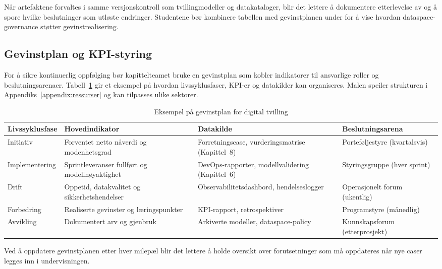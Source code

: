 Når artefaktene forvaltes i samme versjonskontroll som tvillingmodeller og datakataloger, blir det lettere å dokumentere etterlevelse av \citet{gaiax2023architecture} og å spore hvilke beslutninger som utløste endringer. Studentene bør kombinere tabellen med gevinstplanen under for å vise hvordan dataspace-governance støtter gevinstrealisering.

\subsection*{Gevinstplan og KPI-styring}
For å sikre kontinuerlig oppfølging bør kapittelteamet bruke en gevinstplan som kobler indikatorer til ansvarlige roller og beslutningsarenaer. Tabell~\ref{tab:gevinstplan} gir et eksempel på hvordan livssyklusfaser, KPI-er og datakilder kan organiseres. Malen speiler strukturen i Appendiks~\ref{appendix:ressurser} og kan tilpasses ulike sektorer.

\begin{table}[h]
    \centering
    \caption{Eksempel på gevinstplan for digital tvilling}
    \label{tab:gevinstplan}
    \begin{tabular}{p{2.8cm}p{3.8cm}p{3.5cm}p{3.2cm}}
        \toprule
        Livssyklusfase & Hovedindikator & Datakilde & Beslutningsarena \\
        \midrule
        Initiativ & Forventet netto nåverdi og modenhetsgrad & Forretningscase, vurderingsmatrise (Kapittel~8) & Porteføljestyre (kvartalsvis) \\
        Implementering & Sprintleveranser fullført og modellnøyaktighet & DevOps-rapporter, modellvalidering (Kapittel~6) & Styringsgruppe (hver sprint) \\
        Drift & Oppetid, datakvalitet og sikkerhetshendelser & Observabilitetsdashbord, hendelseslogger & Operasjonelt forum (ukentlig) \\
        Forbedring & Realiserte gevinster og læringspunkter & KPI-rapport, retrospektiver & Programstyre (månedlig) \\
        Avvikling & Dokumentert arv og gjenbruk & Arkiverte modeller, dataspace-policy & Kunnskapsforum (etterprosjekt) \\
        \bottomrule
    \end{tabular}
\end{table}

Ved å oppdatere gevinstplanen etter hver milepæl blir det lettere å holde oversikt over forutsetninger som må oppdateres når nye caser legges inn i undervisningen.

